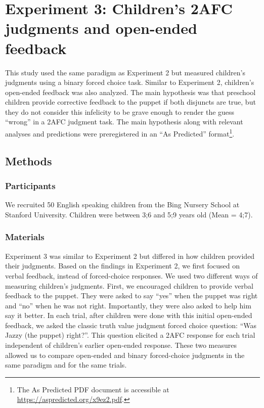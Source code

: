 \documentclass[,man,floatsintext]{apa6}
\let\rmarkdownfootnote\footnote%
\def\footnote{\protect\rmarkdownfootnote}
\begin{document}
\hypertarget{study3}{%
\section{Experiment 3: Children's 2AFC judgments and open-ended feedback}\label{study3}}

This study used the same paradigm as Experiment 2 but measured children's judgments using a binary forced choice task. Similar to Experiment 2, children's open-ended feedback was also analyzed. The main hypothesis was that preschool children provide corrective feedback to the puppet if both disjuncts are true, but they do not consider this infelicity to be grave enough to render the guess \enquote{wrong} in a 2AFC judgment task. The main hypothesis along with relevant analyses and predictions were preregistered in an \enquote{As Predicted} format\footnote{The As Predicted PDF document is accessible at \url{https://aspredicted.org/x9ez2.pdf}.}.

\hypertarget{methods-2}{%
\subsection{Methods}\label{methods-2}}

\hypertarget{participants-2}{%
\subsubsection{Participants}\label{participants-2}}

We recruited 50 English speaking children from the Bing Nursery School at Stanford University. Children were between 3;6 and 5;9 years old (Mean = 4;7).

\hypertarget{materials-1}{%
\subsubsection{Materials}\label{materials-1}}

Experiment 3 was similar to Experiment 2 but differed in how children provided their judgments. Based on the findings in Experiment 2, we first focused on verbal feedback, instead of forced-choice responses. We used two different ways of measuring children's judgments. First, we encouraged children to provide verbal feedback to the puppet. They were asked to say \enquote{yes} when the puppet was right and \enquote{no} when he was not right. Importantly, they were also asked to help him say it better. In each trial, after children were done with this initial open-ended feedback, we asked the classic truth value judgment forced choice question: \enquote{Was Jazzy (the puppet) right?}. This question elicited a 2AFC response for each trial independent of children's earlier open-ended response. These two measures allowed us to compare open-ended and binary forced-choice judgments in the same paradigm and for the same trials.
\end{document}
